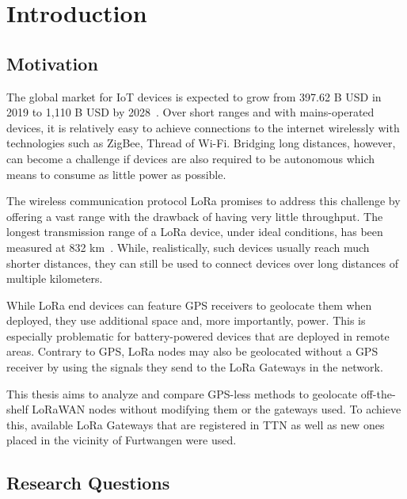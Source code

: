 \chapter{Introduction}

\section{Motivation}

The global market for \ac{IoT} devices is expected to grow from 397.62 B USD in 2019 to 1,110 B USD by 2028~\cite{grand_view_research_global_2022}.
Over short ranges and with mains-operated devices, it is relatively easy to achieve connections to the internet wirelessly with technologies such as ZigBee, Thread of Wi-Fi.
Bridging long distances, however, can become a challenge if devices are also required to be autonomous which means to consume as little power as possible.

The wireless communication protocol \ac{LoRa} promises to address this challenge by offering a vast range with the drawback of having very little throughput.
The longest transmission range of a \ac{LoRa} device, under ideal conditions, has been measured at 832 km~\cite{the_things_network_global_team_lora_nodate}.
While, realistically, such devices usually reach much shorter distances, they can still be used to connect devices over long distances of multiple kilometers.

While \ac{LoRa} end devices can feature \ac{GPS} receivers to geolocate them when deployed, they use additional space and, more importantly, power.
This is especially problematic for battery-powered devices that are deployed in remote areas.
Contrary to \ac{GPS}, \ac{LoRa} nodes may also be geolocated without a \ac{GPS} receiver by using the signals they send to the \ac{LoRa} Gateways in the network.

This thesis aims to analyze and compare \ac{GPS}-less methods to geolocate off-the-shelf \ac{LoRaWAN} nodes without modifying them or the gateways used.
To achieve this, available \ac{LoRa} Gateways that are registered in \acf{TTN} as well as new ones placed in the vicinity of Furtwangen were used.


\section{Research Questions}

